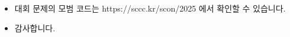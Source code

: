     \begin{frame} %
        \begin{itemize}
            \item 대회 문제의 모범 코드는 https://sccc.kr/scon/2025 에서 확인할 수 있습니다.
            \item 감사합니다.
        \end{itemize}
    \end{frame}

